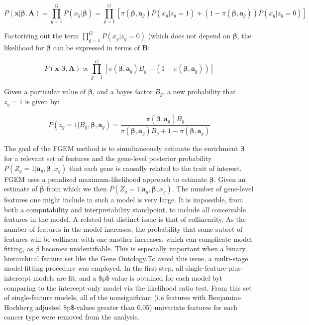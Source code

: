 $$ P(\textbf{x}|\boldsymbol{\beta},\textbf{A})=\prod_{g=1}^{G}P(x_g|\boldsymbol{\beta})=\prod_{g=1}^{G}[\pi(\boldsymbol{\beta},\textbf{a}_g) P(x_g|z_g=1)+(1-\pi(\boldsymbol{\beta},\textbf{a}_g))P(x_g|z_g=0)]$$

Factorizing out the term \(\prod_{g=1}^{G} P(x_g|z_g=0)\) (which does not depend on $\boldsymbol{\beta}$, the likelihood for \(\boldsymbol{\beta}\) can be expressed in terms of \(\textbf{B}\):


$$P(\textbf{x}|\boldsymbol{\beta},\textbf{A}) \propto \prod_{g=1}^{G}[\pi(\boldsymbol{\beta},\textbf{a}_g)B_g+(1-\pi(\boldsymbol{\beta},\textbf{a}_g))]$$

Given a particular value of \(\boldsymbol{\beta}\), and a bayes factor \(B_g\),  a new probability that \(z_g=1\) is given by:

$$P(z_g=1 | B_g, \boldsymbol{\beta},\textbf{a}_g) = \frac{\pi(\boldsymbol{\beta},\textbf{a}_g) B_g}{\pi(\boldsymbol{\beta} , \textbf{a}_g) B_g + 1 - \pi(\boldsymbol{\beta},\textbf{a}_g)}$$


The goal of the FGEM method is to simultaneously estimate the enrichment $\boldsymbol{\beta}$ for a relevant set of features and the gene-level posterior probability \(P(Z_g=1|\textbf{a}_g,\boldsymbol{\beta},x_g)\) that each gene is causally related to the trait of interest.  FGEM uses a penalized maximum-likelihood approach to estimate $\boldsymbol{\beta}$.  Given an estimate of $\boldsymbol{\beta}$  from which we then \(P(Z_g=1|\textbf{a}_g,\boldsymbol{\beta},x_g)\). The number of gene-level features one might include in such a model is very large.
It is impossible, from both a computability and interpretability standpoint, to include all conceivable features in the model. A related but distinct issue is that of collinearity.
As the number of features in the model increases, the probability that some subset of features will be collinear with one-another increases,
which can complicate model-fitting, as \(\beta\) becomes unidentifiable. This is especially important when a binary, hierarchical feature set
like the Gene Ontology.To avoid this issue,  a multi-stage model fitting procedure was employed. In the first step, all
single-feature-plus-intercept models are fit, and a \$p\$-value is obtained for each model byt comparing to the intercept-only model via the
likelihood ratio test.  From this set of single-feature models, all of the nonsignificant (i.e features with Benjamini-Hochberg adjusted
\$p\$-values greater than 0.05) univariate features for each cancer type were removed from the analysis.

